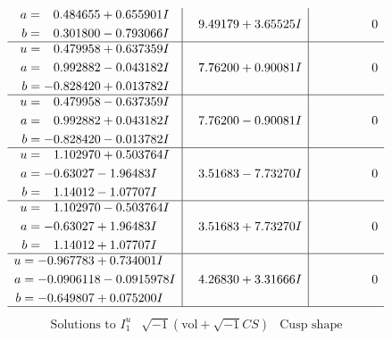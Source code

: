 \documentclass[1p]{elsarticle_modified}
\theoremstyle{definition}
\newcommand{\I}{\sqrt{-1}}
\begin{document}
$$\begin{array}{c|c|c}
\begin{aligned}
a &= \phantom{-}0.484655 + 0.655901 I \\
b &= \phantom{-}0.301800 - 0.793066 I\end{aligned}
 & \phantom{-}9.49179 + 3.65525 I & \phantom{-0.000000 } 0 \\ \hline\begin{aligned}
u &= \phantom{-}0.479958 + 0.637359 I \\
a &= \phantom{-}0.992882 - 0.043182 I \\
b &= -0.828420 + 0.013782 I\end{aligned}
 & \phantom{-}7.76200 + 0.90081 I & \phantom{-0.000000 } 0 \\ \hline\begin{aligned}
u &= \phantom{-}0.479958 - 0.637359 I \\
a &= \phantom{-}0.992882 + 0.043182 I \\
b &= -0.828420 - 0.013782 I\end{aligned}
 & \phantom{-}7.76200 - 0.90081 I & \phantom{-0.000000 } 0 \\ \hline\begin{aligned}
u &= \phantom{-}1.102970 + 0.503764 I \\
a &= -0.63027 - 1.96483 I \\
b &= \phantom{-}1.14012 - 1.07707 I\end{aligned}
 & \phantom{-}3.51683 - 7.73270 I & \phantom{-0.000000 } 0 \\ \hline\begin{aligned}
u &= \phantom{-}1.102970 - 0.503764 I \\
a &= -0.63027 + 1.96483 I \\
b &= \phantom{-}1.14012 + 1.07707 I\end{aligned}
 & \phantom{-}3.51683 + 7.73270 I & \phantom{-0.000000 } 0 \\ \hline\begin{aligned}
u &= -0.967783 + 0.734001 I \\
a &= -0.0906118 - 0.0915978 I \\
b &= -0.649807 + 0.075200 I\end{aligned}
 & \phantom{-}4.26830 + 3.31666 I & \phantom{-0.000000 } 0\\
 \hline 
 \end{array}$$\newpage$$\begin{array}{c|c|c}  
\text{Solutions to }I^u_{1}& \I (\text{vol} + \sqrt{-1}CS) & \text{Cusp shape}\\
 \hline 
\begin{aligned}

\end{aligned}
\end{array}$$
\end{document}
